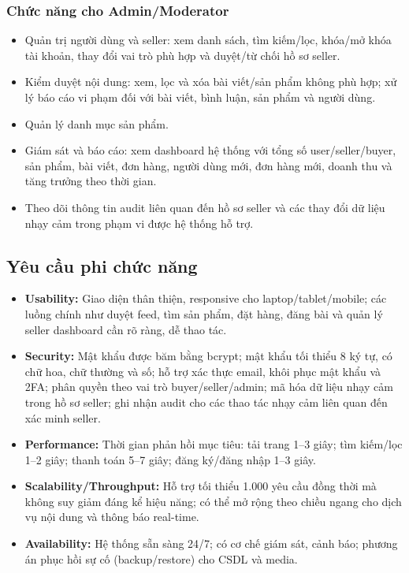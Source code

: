 \subsubsection{Chức năng cho Admin/Moderator}
\begin{itemize}
    \item Quản trị người dùng và seller: xem danh sách, tìm kiếm/lọc, khóa/mở khóa tài khoản, thay đổi vai trò phù hợp và duyệt/từ chối hồ sơ seller.
    \item Kiểm duyệt nội dung: xem, lọc và xóa bài viết/sản phẩm không phù hợp; xử lý báo cáo vi phạm đối với bài viết, bình luận, sản phẩm và người dùng.
    \item Quản lý danh mục sản phẩm.
    \item Giám sát và báo cáo: xem dashboard hệ thống với tổng số user/seller/buyer, sản phẩm, bài viết, đơn hàng, người dùng mới, đơn hàng mới, doanh thu và tăng trưởng theo thời gian.
    \item Theo dõi thông tin audit liên quan đến hồ sơ seller và các thay đổi dữ liệu nhạy cảm trong phạm vi được hệ thống hỗ trợ.
\end{itemize}

\subsection{Yêu cầu phi chức năng}
\begin{itemize}
    \item \textbf{Usability:} Giao diện thân thiện, responsive cho laptop/tablet/mobile; các luồng chính như duyệt feed, tìm sản phẩm, đặt hàng, đăng bài và quản lý seller dashboard cần rõ ràng, dễ thao tác.
    \item \textbf{Security:} Mật khẩu được băm bằng bcrypt; mật khẩu tối thiểu 8 ký tự, có chữ hoa, chữ thường và số; hỗ trợ xác thực email, khôi phục mật khẩu và 2FA; phân quyền theo vai trò buyer/seller/admin; mã hóa dữ liệu nhạy cảm trong hồ sơ seller; ghi nhận audit cho các thao tác nhạy cảm liên quan đến xác minh seller.
    \item \textbf{Performance:} Thời gian phản hồi mục tiêu: tải trang 1–3 giây; tìm kiếm/lọc 1–2 giây; thanh toán 5–7 giây; đăng ký/đăng nhập 1–3 giây.
    \item \textbf{Scalability/Throughput:} Hỗ trợ tối thiểu 1.000 yêu cầu đồng thời mà không suy giảm đáng kể hiệu năng; có thể mở rộng theo chiều ngang cho dịch vụ nội dung và thông báo real-time.
    \item \textbf{Availability:} Hệ thống sẵn sàng 24/7; có cơ chế giám sát, cảnh báo; phương án phục hồi sự cố (backup/restore) cho CSDL và media.
\end{itemize}
